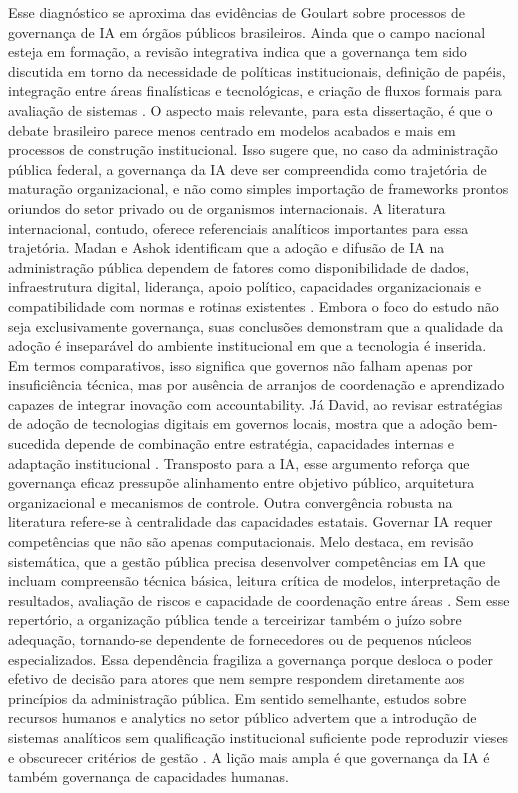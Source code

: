 \documentclass[12pt,a4paper]{article}
\begin{document}
Esse diagnóstico se aproxima das evidências de Goulart sobre processos de governança de IA em órgãos públicos brasileiros. Ainda que o campo nacional esteja em formação, a revisão integrativa indica que a governança tem sido discutida em torno da necessidade de políticas institucionais, definição de papéis, integração entre áreas finalísticas e tecnológicas, e criação de fluxos formais para avaliação de sistemas \autocite{goulart2025processos}. O aspecto mais relevante, para esta dissertação, é que o debate brasileiro parece menos centrado em modelos acabados e mais em processos de construção institucional. Isso sugere que, no caso da administração pública federal, a governança da IA deve ser compreendida como trajetória de maturação organizacional, e não como simples importação de frameworks prontos oriundos do setor privado ou de organismos internacionais.
A literatura internacional, contudo, oferece referenciais analíticos importantes para essa trajetória. Madan e Ashok identificam que a adoção e difusão de IA na administração pública dependem de fatores como disponibilidade de dados, infraestrutura digital, liderança, apoio político, capacidades organizacionais e compatibilidade com normas e rotinas existentes \autocite{madan2022ai}. Embora o foco do estudo não seja exclusivamente governança, suas conclusões demonstram que a qualidade da adoção é inseparável do ambiente institucional em que a tecnologia é inserida. Em termos comparativos, isso significa que governos não falham apenas por insuficiência técnica, mas por ausência de arranjos de coordenação e aprendizado capazes de integrar inovação com accountability. Já David, ao revisar estratégias de adoção de tecnologias digitais em governos locais, mostra que a adoção bem-sucedida depende de combinação entre estratégia, capacidades internas e adaptação institucional \autocite{david2023understanding}. Transposto para a IA, esse argumento reforça que governança eficaz pressupõe alinhamento entre objetivo público, arquitetura organizacional e mecanismos de controle.
Outra convergência robusta na literatura refere-se à centralidade das capacidades estatais. Governar IA requer competências que não são apenas computacionais. Melo destaca, em revisão sistemática, que a gestão pública precisa desenvolver competências em IA que incluam compreensão técnica básica, leitura crítica de modelos, interpretação de resultados, avaliação de riscos e capacidade de coordenação entre áreas \autocite{melo2026competencias}. Sem esse repertório, a organização pública tende a terceirizar também o juízo sobre adequação, tornando-se dependente de fornecedores ou de pequenos núcleos especializados. Essa dependência fragiliza a governança porque desloca o poder efetivo de decisão para atores que nem sempre respondem diretamente aos princípios da administração pública. Em sentido semelhante, estudos sobre recursos humanos e analytics no setor público advertem que a introdução de sistemas analíticos sem qualificação institucional suficiente pode reproduzir vieses e obscurecer critérios de gestão \autocite{cho2023human} \autocite{chilunjika2022artificial} \autocite{barros2025inteligencia}. A lição mais ampla é que governança da IA é também governança de capacidades humanas.
\end{document}
